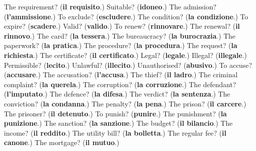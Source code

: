 \begin{tcolorbox}[breakable,colback=teal!4,colframe=teal!35!black,title={Before you move on}]
The requirement? (\textbf{il requisito}.) Suitable? (\textbf{idoneo}.) The admission? (\textbf{l'ammissione}.) To exclude? (\textbf{escludere}.) The condition? (\textbf{la condizione}.) To expire? (\textbf{scadere}.) Valid? (\textbf{valido}.) To renew? (\textbf{rinnovare}.) The renewal? (\textbf{il rinnovo}.) The card? (\textbf{la tessera}.) The bureaucracy? (\textbf{la burocrazia}.) The paperwork? (\textbf{la pratica}.) The procedure? (\textbf{la procedura}.) The request? (\textbf{la richiesta}.) The certificate? (\textbf{il certificato}.) Legal? (\textbf{legale}.) Illegal? (\textbf{illegale}.) Permissible? (\textbf{lecito}.) Unlawful? (\textbf{illecito}.) Unauthorised? (\textbf{abusivo}.) To accuse? (\textbf{accusare}.) The accusation? (\textbf{l'accusa}.) The thief? (\textbf{il ladro}.) The criminal complaint? (\textbf{la querela}.) The corruption? (\textbf{la corruzione}.) The defendant? (\textbf{l'imputato}.) The defence? (\textbf{la difesa}.) The verdict? (\textbf{la sentenza}.) The conviction? (\textbf{la condanna}.) The penalty? (\textbf{la pena}.) The prison? (\textbf{il carcere}.) The prisoner? (\textbf{il detenuto}.) To punish? (\textbf{punire}.) The punishment? (\textbf{la punizione}.) The sanction? (\textbf{la sanzione}.) The budget? (\textbf{il bilancio}.) The income? (\textbf{il reddito}.) The utility bill? (\textbf{la bolletta}.) The regular fee? (\textbf{il canone}.) The mortgage? (\textbf{il mutuo}.)
\end{tcolorbox}
